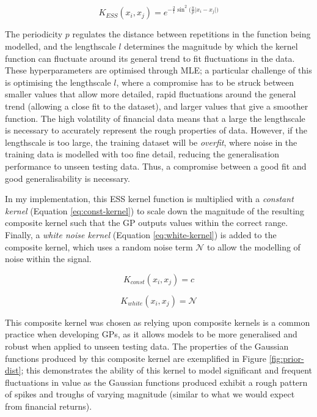 \documentclass[a4paper, 11pt]{article}
\begin{document}
    \begin{equation}
        K_{ESS}(x_i, x_j) = e^{- \frac{2}{l} \sin^2\big(\frac{\pi}{p} \lvert x_i - x_j \rvert \big)}
        \label{eq:ess}
    \end{equation}

    The periodicity $p$ regulates the distance between repetitions in the function being modelled, and the lengthscale $l$ determines the magnitude by which the kernel function can fluctuate around its general trend to fit fluctuations in the data. These hyperparameters are optimised through MLE; a particular challenge of this is optimising the lengthscale $l$, where a compromise has to be struck between smaller values that allow more detailed, rapid fluctuations around the general trend (allowing a close fit to the dataset), and larger values that give a smoother function. The high volatility of financial data means that a large the lengthscale is necessary to accurately represent the rough properties of data. However, if the lengthscale is too large, the training dataset will be \emph{overfit}, where noise in the training data is modelled with too fine detail, reducing the generalisation performance to unseen testing data. Thus, a compromise between a good fit and good generalisability is necessary. 

    In my implementation, this ESS kernel function is multiplied with a \emph{constant kernel} (Equation \ref{eq:const-kernel}) to scale down the magnitude of the resulting composite kernel such that the GP outputs values within the correct range. Finally, a \emph{white noise kernel} (Equation \ref{eq:white-kernel}) is added to the composite kernel, which uses a random noise term $\mathcal{N}$ to allow the modelling of noise within the signal. 

    \begin{equation}
        K_{const}(x_i, x_j) = c
        \label{eq:const-kernel}
    \end{equation}

    \begin{equation}
        K_{white}(x_i, x_j) = \mathcal{N}
        \label{eq:white-kernel}
    \end{equation}

    This composite kernel was chosen as relying upon composite kernels is a common practice when developing GPs, as it allows models to be more generalised and robust when applied to unseen testing data. The properties of the Gaussian functions produced by this composite kernel are exemplified in Figure \ref{fig:prior-dist}; this demonstrates the ability of this kernel to model significant and frequent fluctuations in value as the Gaussian functions produced exhibit a rough pattern of spikes and troughs of varying magnitude (similar to what we would expect from financial returns).
    
\end{document}
